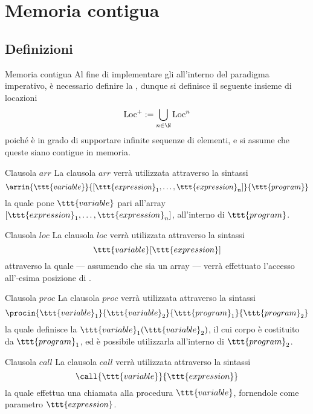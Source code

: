 \documentclass[a4paper, 12pt]{report}
\begin{document}
    \section{Memoria contigua}

    \subsection{Definizioni}

    \begin{frameddefn}{Memoria contigua}
        Al fine di implementare gli  all'interno del paradigma imperativo, è necessario definire la , dunque si definisce il seguente insieme di locazioni $$\displaystyle \mathrm{Loc}^+ := \bigcup_{n \in \N}{\mathrm{Loc}^n}$$ poiché è in grado di supportare infinite sequenze di elementi, e si assume che queste siano contigue in memoria.
    \end{frameddefn}

    \begin{frameddefn}{Clausola $arr$}
        La clausola $arr$ verrà utilizzata attraverso la sintassi $$\arrin{\ttt{variable}}{[\ttt{expression}_1, \ldots, \ttt{expression}_n]}{\ttt{program}}$$ la quale pone $\ttt{variable}$ pari all'array $[\ttt{expression}_1, \ldots, \ttt{expression}_n]$, all'interno di $\ttt{program}$.
    \end{frameddefn}

    \begin{frameddefn}{Clausola $loc$}
        La clausola $loc$ verrà utilizzata attraverso la sintassi $$\ttt{variable}[\ttt{expression}]$$ attraverso la quale --- assumendo che  sia un array --- verrà effettuato l'accesso all'-esima posizione di .
    \end{frameddefn}

    \begin{frameddefn}{Clausola $proc$}
        La clausola $proc$ verrà utilizzata attraverso la sintassi $$\procin{\ttt{variable}_1}{\ttt{variable}_2}{\ttt{program}_1}{\ttt{program}_2}$$ la quale definisce la  $\ttt{variable}_1(\ttt{variable}_2)$, il cui corpo è costituito da $\ttt{program}_1$, ed è possibile utilizzarla all'interno di $\ttt{program}_2$.
    \end{frameddefn}

    \begin{frameddefn}{Clausola $call$}
        La clausola $call$ verrà utilizzata attraverso la sintassi $$\call{\ttt{variable}}{\ttt{expression}}$$ la quale effettua una chiamata alla procedura $\ttt{variable}$, fornendole come parametro $\ttt{expression}$.
    \end{frameddefn}
\end{document}

